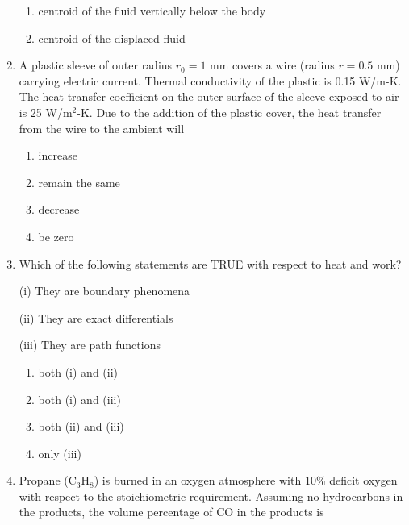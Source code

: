 \documentclass[journal,11pt,onecolumn]{IEEEtran}
\begin{document}
\begin{enumerate}
\begin{enumerate}
              \item centroid of the fluid vertically below the body

              \item centroid of the displaced fluid

          \end{enumerate}

    \item A plastic sleeve of outer radius $r_0 = 1$ mm covers a wire (radius $r = 0.5$ mm) carrying electric current. Thermal conductivity of the plastic is 0.15 W/m-K. The heat transfer coefficient on the outer surface of the sleeve exposed to air is 25 W/m$^2$-K. Due to the addition of the plastic cover, the heat transfer from the wire to the ambient will

          \begin{enumerate}

              \item increase

              \item remain the same

              \item decrease

              \item be zero

          \end{enumerate}

    \item Which of the following statements are TRUE with respect to heat and work?

          (i) They are boundary phenomena

          (ii) They are exact differentials

          (iii) They are path functions

          \begin{enumerate}

              \item both (i) and (ii)

              \item both (i) and (iii)

              \item both (ii) and (iii)

              \item only (iii)

          \end{enumerate}

    \item Propane (C$_3$H$_8$) is burned in an oxygen atmosphere with 10\% deficit oxygen with respect to the stoichiometric requirement. Assuming no hydrocarbons in the products, the volume percentage of CO in the products is \underline{\hspace{2cm}}


\end{enumerate}
\end{document}
